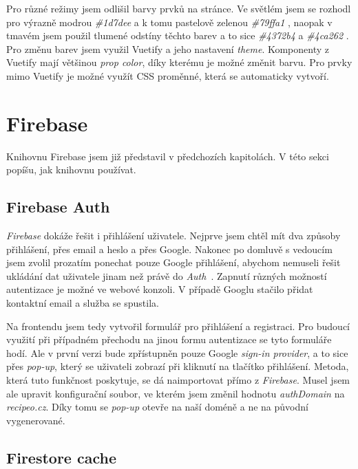 Pro různé režimy jsem odlišil barvy prvků na stránce. Ve světlém jsem se rozhodl pro výrazně modrou \emph{\#1d7dee}  a k tomu
pastelově zelenou \emph{\#79ffa1}  , naopak v tmavém jsem použil tlumené odstíny těchto barev a to sice \emph{\#4372b4}   a \emph{\#4ca262}  .
Pro změnu barev jsem využil Vuetify a jeho nastavení \emph{theme}. Komponenty z Vuetify mají většinou \emph{prop color}, díky
kterému je možné změnit barvu. Pro prvky mimo Vuetify je možné využít CSS proměnné, která se automaticky vytvoří.

\section{Firebase}

Knihovnu Firebase jsem již představil v předchozích kapitolách. V této sekci popíšu, jak knihovnu používat.

\subsection{Firebase Auth}
\emph{Firebase} dokáže řešit i přihlášení uživatele. Nejprve jsem chtěl mít dva způsoby přihlášení, přes email a heslo a přes
Google. Nakonec po domluvě s vedoucím jsem zvolil prozatím ponechat pouze Google přihlášení, abychom nemuseli řešit ukládání
dat uživatele jinam než právě do \emph{Auth}~\cite{FirebaseAuth}. Zapnutí různých možností autentizace je možné ve webové konzoli. V případě Googlu
stačilo přidat kontaktní email a služba se spustila.

Na frontendu jsem tedy vytvořil formulář pro přihlášení a registraci. Pro budoucí využití při případném přechodu na jinou formu
autentizace se tyto formuláře hodí. Ale v první verzi bude zpřístupněn pouze Google \emph{sign-in provider}, a to sice přes \emph{pop-up},
který se uživateli zobrazí při kliknutí na tlačítko přihlášení. Metoda, která tuto funkčnost poskytuje, se dá naimportovat přímo
z \emph{Firebase}. Musel jsem ale upravit konfigurační soubor, ve kterém jsem změnil hodnotu \emph{authDomain} na \emph{recipeo.cz}.
Díky tomu se \emph{pop-up} otevře na naší doméně a ne na původní vygenerované.

\subsection{Firestore cache}
